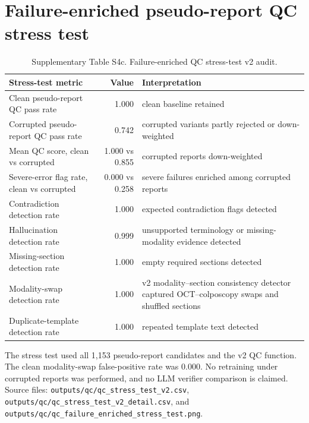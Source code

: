 \documentclass[11pt,a4paper]{article}
\begin{document}
\section*{Failure-enriched pseudo-report QC stress test}
\begin{table}[!htbp]
  \centering
  \caption{Supplementary Table S4c. Failure-enriched QC stress-test v2 audit.}
  \label{tab:qc_failure_stress_test}
  \small
  \begin{threeparttable}
  \begin{tabular}{p{5.0cm}rp{5.2cm}}
    \toprule
    \textbf{Stress-test metric} & \textbf{Value} & \textbf{Interpretation} \\
    \midrule
    Clean pseudo-report QC pass rate & 1.000 & clean baseline retained \\
    Corrupted pseudo-report QC pass rate & 0.742 & corrupted variants partly rejected or down-weighted \\
    Mean QC score, clean vs corrupted & 1.000 vs 0.855 & corrupted reports down-weighted \\
    Severe-error flag rate, clean vs corrupted & 0.000 vs 0.258 & severe failures enriched among corrupted reports \\
    Contradiction detection rate & 1.000 & expected contradiction flags detected \\
    Hallucination detection rate & 0.999 & unsupported terminology or missing-modality evidence detected \\
    Missing-section detection rate & 1.000 & empty required sections detected \\
    Modality-swap detection rate & 1.000 & v2 modality--section consistency detector captured OCT--colposcopy swaps and shuffled sections \\
    Duplicate-template detection rate & 1.000 & repeated template text detected \\
    \bottomrule
  \end{tabular}
  \begin{tablenotes}[flushleft]
    \footnotesize
    \item The stress test used all 1,153 pseudo-report candidates and the v2 QC function. The clean modality-swap false-positive rate was 0.000. No retraining under corrupted reports was performed, and no LLM verifier comparison is claimed. Source files: \texttt{outputs/qc/qc\_stress\_test\_v2.csv}, \texttt{outputs/qc/qc\_stress\_test\_v2\_detail.csv}, and \texttt{outputs/qc/qc\_failure\_enriched\_stress\_test.png}.
  \end{tablenotes}
  \end{threeparttable}
\end{table}
\end{document}
